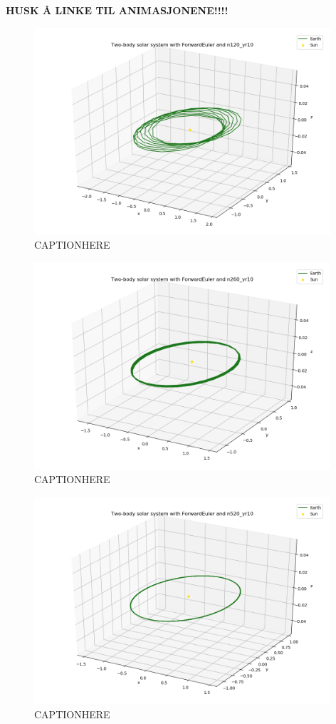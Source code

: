 \documentclass{article}
\begin{document}
    \textbf{HUSK Å LINKE TIL ANIMASJONENE!!!!}

    \begin{figure}[H]
        \centering
        \includegraphics[width = 11cm]{img/plot3D_S_E_F_n120_yr10.png}
        \caption{CAPTIONHERE}
        \label{fig:plot3D_S_E_F_n120_yr10}
    \end{figure}

    \begin{figure}[H]
        \centering
        \includegraphics[width = 11cm]{img/plot3D_S_E_F_n260_yr10.png}
        \caption{CAPTIONHERE}
        \label{fig:plot3D_S_E_F_n260_yr10}
    \end{figure}

    \begin{figure}[H]
        \centering
        \includegraphics[width = 11cm]{img/plot3D_S_E_F_n520_yr10.png}
        \caption{CAPTIONHERE}
        \label{fig:plot3D_S_E_F_n520_yr10}
    \end{figure}
\end{document}
